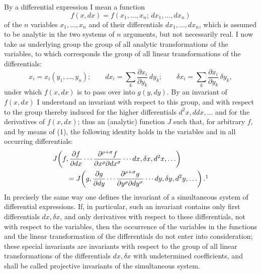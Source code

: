 \documentclass[11pt]{article}
\begin{document}
By a differential expression I mean a function
\[
f(x,dx)=f(x_1,\ldots,x_n;\,dx_1,\ldots,dx_n)
\]
of the \(n\) variables \(x_1,\ldots,x_n\) and of their differentials
\(dx_1,\ldots,dx_n\), which is assumed to be analytic in the two systems
of \(n\) arguments, but not necessarily real. I now take as underlying
group the group of all analytic transformations of the variables, to
which corresponds the group of all linear transformations of the
differentials:
\begin{equation}
x_i=x_i(y_1,\ldots,y_n);\qquad
dx_i=\sum_k\frac{\partial x_i}{\partial y_k}\,dy_k;\qquad
\delta x_i=\sum_k\frac{\partial x_i}{\partial y_k}\,\delta y_k,
\tag{1}
\end{equation}
under which \(f(x,dx)\) is to pass over into \(g(y,dy)\). By an invariant
of \(f(x,dx)\) I understand an invariant with respect to this group, and
with respect to the group thereby induced for the higher differentials
\(d^2x,ddx,\ldots\) and for the derivatives of \(f(x,dx)\); thus an
(analytic) function \(J\) such that, for arbitrary \(f\), and by means of
(1), the following identity holds in the variables and in all occurring
differentials:
\[
\begin{aligned}
&J\!\left(f,\frac{\partial f}{\partial dx}\cdots
\frac{\partial^{\rho+\sigma}f}{\partial x^\rho\partial dx^\sigma}
\cdots dx,\delta x,d^2x,\ldots\right)\\
&\qquad =
J\!\left(g,\frac{\partial g}{\partial dy}\cdots
\frac{\partial^{\rho+\sigma}g}{\partial y^\rho\partial dy^\sigma}
\cdots dy,\delta y,d^2y,\ldots\right).\footnotemark
\end{aligned}
\]
In precisely the same way one defines the invariant of a simultaneous
system of differential expressions. If, in particular, such an invariant
contains only first differentials \(dx,\delta x\), and only derivatives
with respect to these differentials, not with respect to the variables,
then the occurrence of the variables in the functions and the linear
transformation of the differentials do not enter into consideration;
these special invariants are invariants with respect to the group of all
linear transformations of the differentials \(dx,\delta x\) with
undetermined coefficients, and shall be called projective invariants of
the simultaneous system.
\end{document}
